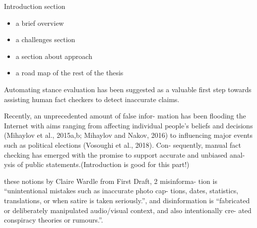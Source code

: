 
{\color{orange} Introduction section}

\begin{itemize}
    \item a brief overview
    \item a challenges section
    \item a section about approach
    \item a road map of the rest of the thesis
\end{itemize}


Automating stance evaluation has been suggested as a valuable first step towards assisting human fact checkers to detect inaccurate claims.\cite{UCLMR}


Recently, an unprecedented amount of false infor-
mation has been flooding the Internet with aims
ranging from affecting individual people’s beliefs
and decisions (Mihaylov et al., 2015a,b; Mihaylov
and Nakov, 2016) to influencing major events such
as political elections (Vosoughi et al., 2018). Con-
sequently, manual fact checking has emerged with
the promise to support accurate and unbiased anal-
ysis of public statements.\cite{memory_network}{\color{orange}(Introduction is good for this part!)}

these notions by Claire Wardle from First Draft, 2 misinforma-
tion is “unintentional mistakes such as inaccurate photo cap-
tions, dates, statistics, translations, or when satire is taken
seriously.”, and disinformation is “fabricated or deliberately
manipulated audio/visual context, and also intentionally cre-
ated conspiracy theories or rumours.”.\cite{stace_survey}